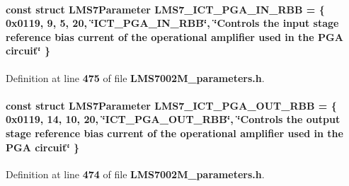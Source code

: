 \paragraph[{L\+M\+S7\+\_\+\+I\+C\+T\+\_\+\+P\+G\+A\+\_\+\+I\+N\+\_\+\+R\+BB}]{\setlength{\rightskip}{0pt plus 5cm}const struct {\bf L\+M\+S7\+Parameter} L\+M\+S7\+\_\+\+I\+C\+T\+\_\+\+P\+G\+A\+\_\+\+I\+N\+\_\+\+R\+BB = \{ 0x0119, 9, 5, 20, \char`\"{}\+I\+C\+T\+\_\+\+P\+G\+A\+\_\+\+I\+N\+\_\+\+R\+B\+B\char`\"{}, \char`\"{}\+Controls the input stage reference bias current of the operational amplifier used in the P\+G\+A circuit\char`\"{} \}\hspace{0.3cm}{\ttfamily [static]}}\label{LMS7002M__parameters_8h_ad40507b19e430b5ae3673d194e81f187}


Definition at line {\bf 475} of file {\bf L\+M\+S7002\+M\+\_\+parameters.\+h}.

\paragraph[{L\+M\+S7\+\_\+\+I\+C\+T\+\_\+\+P\+G\+A\+\_\+\+O\+U\+T\+\_\+\+R\+BB}]{\setlength{\rightskip}{0pt plus 5cm}const struct {\bf L\+M\+S7\+Parameter} L\+M\+S7\+\_\+\+I\+C\+T\+\_\+\+P\+G\+A\+\_\+\+O\+U\+T\+\_\+\+R\+BB = \{ 0x0119, 14, 10, 20, \char`\"{}\+I\+C\+T\+\_\+\+P\+G\+A\+\_\+\+O\+U\+T\+\_\+\+R\+B\+B\char`\"{}, \char`\"{}\+Controls the output stage reference bias current of the operational amplifier used in the P\+G\+A circuit\char`\"{} \}\hspace{0.3cm}{\ttfamily [static]}}\label{LMS7002M__parameters_8h_ac7f448dd12d3775e287f1253566ca5fd}


Definition at line {\bf 474} of file {\bf L\+M\+S7002\+M\+\_\+parameters.\+h}.

